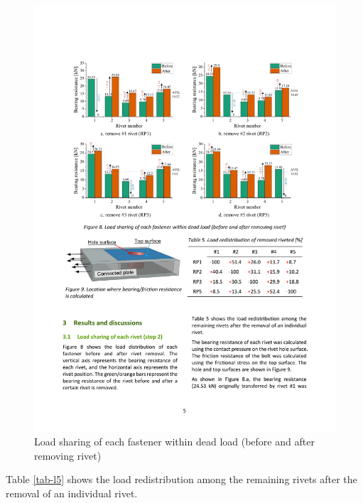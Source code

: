 \begin{figure}[htbp]
    \centering
    \includegraphics[width=\textwidth]{imgs/ch4/fig-l8.pdf}
    \caption{Load sharing of each fastener within dead load (before and after removing rivet)}
    \label{fig-l8}
\end{figure}

Table \ref{tab-l5} shows the load redistribution among the remaining rivets after the removal of an individual rivet.

